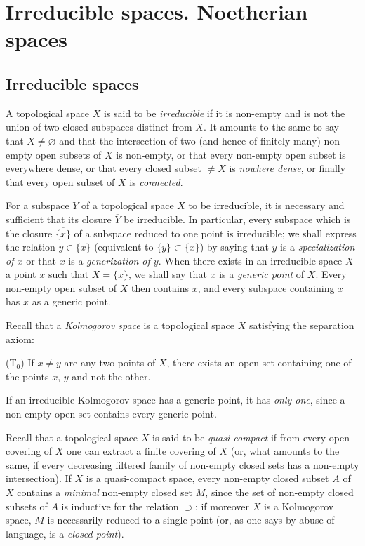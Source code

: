 \section{Irreducible spaces. Noetherian spaces}
\label{section:0.2}

\subsection{Irreducible spaces}
\label{subsection:0.2.1}

\begin{env}[2.1.1]
\label{0.2.1.1}
A topological space $X$ is said to be \emph{irreducible} if it is non-empty
and is not the union of two closed subspaces distinct from $X$. It
amounts to the same to say that $X\neq\varnothing$ and that the intersection of two
(and hence of finitely many) non-empty open subsets of $X$ is non-empty,
or that every non-empty open subset is everywhere dense, or that every closed
subset $\neq X$ is \emph{nowhere dense}, or finally that every open subset of $X$ is
\emph{connected}.
\end{env}

\begin{env}[2.1.2]
\label{0.2.1.2}
For a subspace $Y$ of a topological space $X$ to be irreducible, it is
necessary and sufficient that its closure $\overline Y$ be irreducible. In
particular, every subspace which is the closure $\overline{\{x\}}$ of a
subspace reduced to one point is irreducible; we shall express the relation
$y\in\overline{\{x\}}$ (equivalent to
$\overline{\{y\}}\subset\overline{\{x\}}$) by saying that $y$ is a
\emph{specialization of $x$} or that $x$ is a \emph{generization of $y$}.
When there exists in an irreducible space $X$ a point $x$ such that
$X=\overline{\{x\}}$, we shall say that $x$ is a \emph{generic point} of $X$.
Every non-empty open subset of $X$ then contains $x$, and every subspace containing
$x$ has $x$ as a generic point.
\end{env}

\begin{env}[2.1.3]
\label{0.2.1.3}
Recall that a \emph{Kolmogorov space} is a topological space $X$
satisfying the separation axiom:

\smallskip
\noindent
\textup{(T$_0$)} If $x\neq y$ are any two points of $X$, there exists
an open set containing one of the points $x$, $y$ and not the other.

If an irreducible Kolmogorov space has a generic point, it has
\emph{only one}, since a non-empty open set contains every generic
point.

Recall that a topological space $X$ is said to be \emph{quasi-compact} if from every
open covering of $X$ one can extract a finite covering of $X$ (or,
what amounts to the same, if every decreasing filtered family of non-empty closed
sets has a non-empty intersection). If $X$ is a
quasi-compact space, every non-empty closed subset $A$ of $X$ contains a
\emph{minimal} non-empty closed set $M$, since the set of non-empty closed subsets
of $A$ is inductive for the relation $\supset$; if moreover $X$ is a
Kolmogorov space, $M$ is necessarily reduced to a single point (or, as one
says by abuse of language, is a \emph{closed point}).
\end{env}

